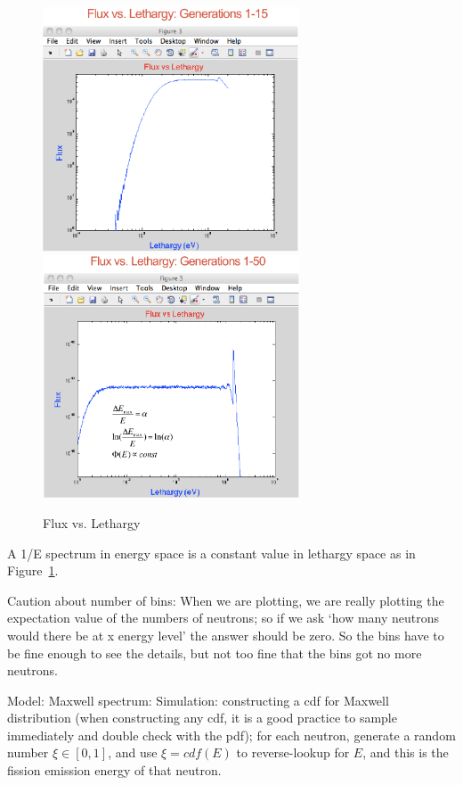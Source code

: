 \documentclass{school-22.211-notes}
\begin{document}
\begin{figure}[ht]
  \centering
  \includegraphics[width=3in]{images/sl-d/flux-vs-lethargy-1.png}
  \includegraphics[width=3in]{images/sl-d/flux-vs-lethargy-2.png}
  \caption{Flux vs. Lethargy} \label{fvl}
\end{figure}
A 1/E spectrum in energy space is a constant value in lethargy space as in Figure~\ref{fvl}. 

Caution about number of bins: When we are plotting, we are really plotting the expectation value of the numbers of neutrons; so if we ask `how many neutrons would there be at x energy level' the answer should be zero. So the bins have to be fine enough to see the details, but not too fine that the bins got no more neutrons. 

\clearpage
{}
Model: Maxwell spectrum:
Simulation: constructing a cdf for Maxwell distribution (when constructing any cdf, it is a good practice to sample immediately and double check with the pdf); for each neutron, generate a random number $\xi \in [0,1]$, and use $\xi = cdf(E)$ to reverse-lookup for $E$, and this is the fission emission energy of that neutron. 
\end{document}
